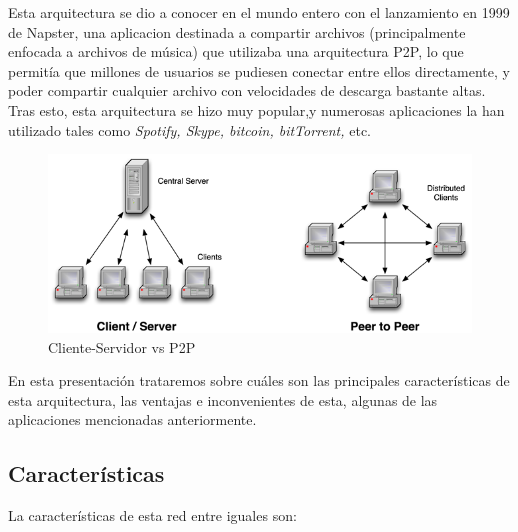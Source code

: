 \documentclass[11pt,a4paper]{article}
\begin{document}
Esta arquitectura se dio a conocer en el mundo entero con el lanzamiento en 1999 de Napster, una aplicacion destinada a compartir archivos (principalmente enfocada a archivos de música) que utilizaba una arquitectura P2P, lo que permitía que millones de usuarios se pudiesen conectar entre ellos directamente, y poder compartir cualquier archivo con velocidades de descarga bastante altas. Tras esto, esta arquitectura se hizo muy popular,y numerosas aplicaciones la han utilizado tales como \textit{Spotify, Skype, bitcoin, bitTorrent,}  etc.\\

\begin{figure}[h]
	\includegraphics[width=12cm]{clientserverp2p}
	\centering		
	\caption{Cliente-Servidor vs P2P}
	\label{p3}
\end{figure}

En esta presentación trataremos sobre cuáles son las principales características de esta arquitectura, las ventajas e inconvenientes de esta, algunas de las aplicaciones mencionadas anteriormente.

\subsection{Características}
La características de esta red entre iguales son:\\
\end{document}
